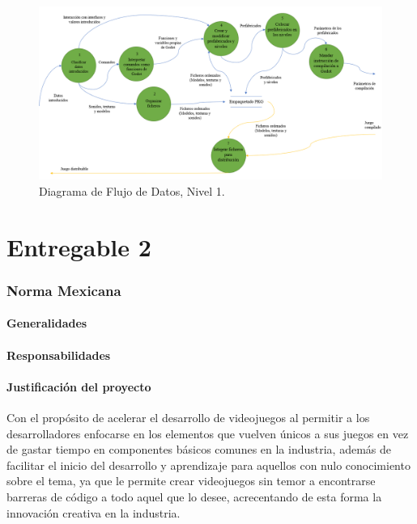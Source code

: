 \documentclass[]{article}
\begin{document}
\begin{figure}[H]
	
	\centering
	\includegraphics[width=1\textwidth]{DFD2}
	\caption{Diagrama de Flujo de Datos, Nivel 1.} 
	\label{DFD1}
	
\end{figure}




  



\newpage
\part{Entregable 2}
\section{Norma Mexicana}
\subsection{Generalidades}
\subsection{Responsabilidades}
\subsection{Justificaci\'on del proyecto}
Con el propósito de acelerar el desarrollo de videojuegos al permitir a los desarrolladores enfocarse en los elementos que vuelven \'unicos a sus
juegos en vez de gastar tiempo en componentes b\'asicos comunes en la industria, adem\'as de facilitar el inicio del desarrollo y aprendizaje para aquellos con nulo conocimiento sobre el tema, ya que le permite crear videojuegos sin temor a encontrarse barreras de c\'odigo a todo aquel que lo desee, acrecentando de esta forma la innovaci\'on creativa en la industria.
\end{document}
